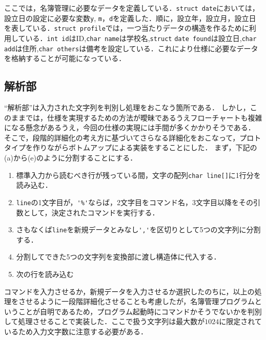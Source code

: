 \documentclass[a4j,11pt]{jarticle}
\begin{document}
ここでは，名簿管理に必要なデータを定義している．\verb|struct date|においては，設立日の設定に必要な変数\verb|y|, \verb|m|，\verb|d|を定義した．順に，設立年，設立月，設立日を表している．\verb|struct profile|では，一つ当たりデータの構造を作るために利用している．\verb|int id|はID,\verb|char name|は学校名,\verb|struct| \verb|date found|は設立日,\verb|char add|は住所,\verb|char others|は備考を設定している．これにより仕様に必要なデータを格納することが可能になっている．

\subsection{解析部} \label{sec:parse}

``解析部''は入力された文字列を判別し処理をおこなう箇所である．
しかし，このままでは，仕様を実現するための方法が曖昧であるうえフローチャートも複雑になる懸念があるうえ，今回の仕様の実現には手間が多くかかりそうである．
そこで，段階的詳細化の考え方に基づいてさらなる詳細化をおこなって，プロトタイプを作りながらボトムアップによる実装をすることにした．
まず，下記の(a)から(e)のように分割することにする．

\begin{enumerate}
\setlength{\parskip}{2pt} \setlength{\itemsep}{2pt}
\renewcommand{\labelenumi}{(\alph{enumi})} %
    \item 標準入力から読むべき行が残っている間，文字の配列\verb|char line[]|に1行分を読み込む．
    \item \verb|line|の1文字目が，\verb|'%'|ならば，2文字目をコマンド名，3文字目以降をその引数として，決定されたコマンドを実行する．
    \item さもなくば\verb|line|を新規データとみなし\verb|','|を区切りとして5つの文字列に分割する．
    \item 分割してできた5つの文字列を変換部に渡し構造体に代入する．
    \item 次の行を読み込む
\end{enumerate}
コマンドを入力させるか，新規データを入力させるか選択したのちに，以上の処理をさせるように一段階詳細化させることも考慮したが，名簿管理プログラムということが自明であるため，プログラム起動時にコマンドかそうでないかを判別して処理させることで実装した．ここで扱う文字列は最大数が$1024$に限定されているため入力文字数に注意する必要がある．

\end{document}
